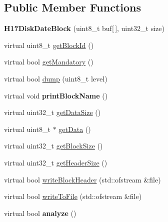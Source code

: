 \subsection*{Public Member Functions}
\begin{DoxyCompactItemize}
\item 
\hypertarget{classH17DiskDateBlock_a664756ccae16866d22f58a04d0f3305d}{}{\bfseries H17\+Disk\+Date\+Block} (uint8\+\_\+t buf\mbox{[}$\,$\mbox{]}, uint32\+\_\+t size)\label{classH17DiskDateBlock_a664756ccae16866d22f58a04d0f3305d}

\item 
virtual uint8\+\_\+t \hyperlink{classH17DiskDateBlock_a044c38a8756b4f1a1af62fc9a118c99b}{get\+Block\+Id} ()
\item 
virtual bool \hyperlink{classH17DiskDateBlock_aea2b33eece976bb01a4a9b9803c38406}{get\+Mandatory} ()
\item 
virtual bool \hyperlink{classH17DiskDateBlock_a76a79e028f53a6f53a1443a3e6a99077}{dump} (uint8\+\_\+t level)
\item 
\hypertarget{classH17DiskDateBlock_aed366a04d847ed3e726923e5b77d03cf}{}virtual void {\bfseries print\+Block\+Name} ()\label{classH17DiskDateBlock_aed366a04d847ed3e726923e5b77d03cf}

\item 
virtual uint32\+\_\+t \hyperlink{classH17Block_aa2e87b141623b4c897c5337ea0535d1c}{get\+Data\+Size} ()
\item 
virtual uint8\+\_\+t $\ast$ \hyperlink{classH17Block_a6c2432cccdacdfb1a335bd924f19d942}{get\+Data} ()
\item 
virtual uint32\+\_\+t \hyperlink{classH17Block_a0327b6359cdf502269bbb7c6f35fae18}{get\+Block\+Size} ()
\item 
virtual uint32\+\_\+t \hyperlink{classH17Block_ad71ae203afc8713d4ee7416757fadbbe}{get\+Header\+Size} ()
\item 
virtual bool \hyperlink{classH17Block_a5c4d56a6c991c87fb9215797ce63b804}{write\+Block\+Header} (std\+::ofstream \&file)
\item 
virtual bool \hyperlink{classH17Block_a59901675cd140c907fb6de4c8e0452d5}{write\+To\+File} (std\+::ofstream \&file)
\item 
\hypertarget{classH17Block_ae53600d945ed3ffac13d3a769a1e1ab2}{}virtual bool {\bfseries analyze} ()\label{classH17Block_ae53600d945ed3ffac13d3a769a1e1ab2}

\end{DoxyCompactItemize}
